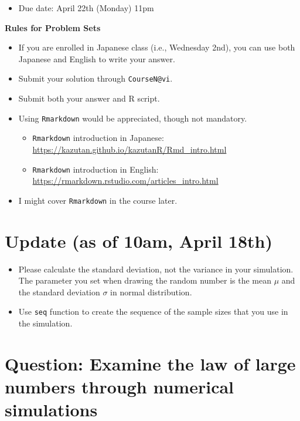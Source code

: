 \documentclass[]{book}
\providecommand{\tightlist}{%
  \setlength{\itemsep}{0pt}\setlength{\parskip}{0pt}}
\begin{document}
\begin{itemize}
\tightlist
\item
  Due date: April 22th (Monday) 11pm
\end{itemize}

\textbf{Rules for Problem Sets}

\begin{itemize}
\tightlist
\item
  If you are enrolled in Japanese class (i.e., Wednesday 2nd), you can
  use both Japanese and English to write your answer.
\item
  Submit your solution through \texttt{CourseN@vi}.
\item
  Submit both your answer and R script.
\item
  Using \texttt{Rmarkdown} would be appreciated, though not mandatory.

  \begin{itemize}
  \tightlist
  \item
    \texttt{Rmarkdown} introduction in Japanese:
    \url{https://kazutan.github.io/kazutanR/Rmd_intro.html}
  \item
    \texttt{Rmarkdown} introduction in English:
    \url{https://rmarkdown.rstudio.com/articles_intro.html}
  \end{itemize}
\item
  I might cover \texttt{Rmarkdown} in the course later.
\end{itemize}

\section{Update (as of 10am, April
18th)}\label{update-as-of-10am-april-18th}

\begin{itemize}
\tightlist
\item
  Please calculate the standard deviation, not the variance in your
  simulation. The parameter you set when drawing the random number is
  the mean \(\mu\) and the standard deviation \(\sigma\) in normal
  distribution.
\item
  Use \texttt{seq} function to create the sequence of the sample sizes
  that you use in the simulation.
\end{itemize}

\section{Question: Examine the law of large numbers through numerical
simulations}\label{question-examine-the-law-of-large-numbers-through-numerical-simulations}
\end{document}
